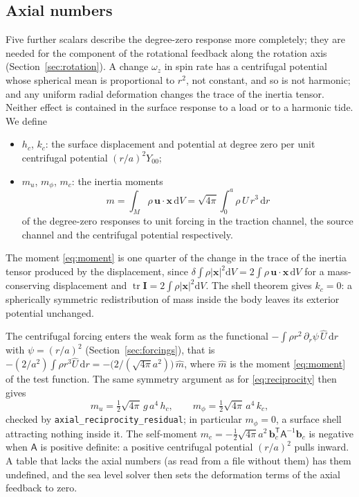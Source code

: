 \documentclass[11pt,a4paper]{article}
\newcommand{\dd}{\mathrm{d}}
\newcommand{\x}{\mathbf{x}}
\newcommand{\uu}{\mathbf{u}}
\newcommand{\code}[1]{\texttt{#1}}
\numberwithin{equation}{section}
\begin{document}
\subsection{Axial numbers}
\label{sec:axial}

Five further scalars describe the degree-zero response more completely; they
are needed for the component of the rotational feedback along the rotation
axis (Section~\ref{sec:rotation}). A change $\omega_{z}$ in spin rate has a
centrifugal potential whose spherical mean is proportional to $r^{2}$, not
constant, and so is not harmonic; and any uniform radial deformation changes
the trace of the inertia tensor. Neither effect is contained in the surface
response to a load or to a harmonic tide. We define
\begin{itemize}
\item[] $h_{c}$, $k_{c}$: the surface displacement and potential at degree zero
per unit centrifugal potential $(r/a)^{2}Y_{00}$;
\item[] $m_{u}$, $m_{\phi}$, $m_{c}$: the inertia moments
\begin{equation}
m = \int_{M}\rho\,\uu\cdot\x\,\dd V = \sqrt{4\pi}\int_{0}^{a}\rho\,U\,r^{3}\,\dd r
\label{eq:moment}
\end{equation}
of the degree-zero responses to unit forcing in the traction channel, the
source channel and the centrifugal potential respectively.
\end{itemize}
The moment \eqref{eq:moment} is one quarter of the change in the trace of the
inertia tensor produced by the displacement, since
$\delta\!\int\rho|\x|^{2}\dd V = 2\int\rho\,\uu\cdot\x\,\dd V$ for a
mass-conserving displacement and $\operatorname{tr}\mathbf{I}=2\int\rho|\x|^{2}\dd V$.
The shell theorem gives $k_{c}=0$: a spherically symmetric redistribution of
mass inside the body leaves its exterior potential unchanged.

The centrifugal forcing enters the weak form as the functional
$-\int\rho r^{2}\,\partial_{r}\psi\,\hat U\,\dd r$ with $\psi=(r/a)^{2}$
(Section~\ref{sec:forcings}), that is
$-(2/a^{2})\int\rho r^{3}\hat U\,\dd r = -\big(2/(\sqrt{4\pi}a^{2})\big)\,\hat m$,
where $\hat m$ is the moment \eqref{eq:moment} of the test function. The same
symmetry argument as for \eqref{eq:reciprocity} then gives
\begin{equation}
m_{u} = \tfrac12\sqrt{4\pi}\,g\,a^{4}\,h_{c},\qquad
m_{\phi} = \tfrac12\sqrt{4\pi}\,a^{4}\,k_{c},
\label{eq:axialreciprocity}
\end{equation}
checked by \code{axial\_reciprocity\_residual}; in particular $m_{\phi}=0$, a
surface shell attracting nothing inside it. The self-moment
$m_{c}=-\tfrac12\sqrt{4\pi}a^{2}\,\mathbf{b}_{c}^{\mathsf T}\mathsf{A}^{-1}\mathbf{b}_{c}$
is negative when $\mathsf A$ is positive definite: a positive centrifugal
potential $(r/a)^{2}$ pulls inward. A table that lacks the axial numbers
(as read from a file without them) has them undefined, and the sea level solver then
sets the deformation terms of the axial feedback to zero.
\end{document}
